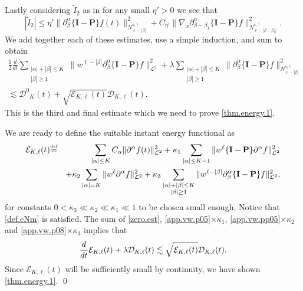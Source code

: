 \documentclass{amsart}
\numberwithin{equation}{section}
\begin{document}
Lastly considering $\tilde{I}_2$ as in \cite[(8.29)]{gsNonCut0} for any small $\eta'>0$ we see that
$$
\left| \tilde{I}_2 \right| 
\le
\eta'
\|\partial_{\beta}^{\alpha}\{{\mathbf{I}}-{\mathbf{P}}\}{f}(t)\|_{N^{s,\gamma}_{\ell - |\beta|}}^{2}
+
C_{\eta'}\|\nabla_{x}\partial_{\beta-\beta_{1}}^{\alpha}\{{\mathbf{I}}-{\mathbf{P}}\}{f} \|_{N^{s,\gamma}_{\ell - |\beta-\beta_1|}}^{2}.
$$
We add together each of these estimates, use a simple induction, and sum to obtain
\begin{multline}
\frac{1}{2}\frac{d}{dt}\sum_{\substack{|{\alpha}|+|{\beta}|\leq {K}\\ |{\beta}|\geq 1}}\|w^{{\ell}-|{\beta}|}{\partial}^{\alpha}_{\beta} \{{\mathbf{I}}-{\mathbf{P}}\} {f}\|_{{\mathcal{L}}^2}^2
+
{\lambda} 
\sum_{\substack{|{\alpha}|+|{\beta}|\leq {K}\\ |{\beta}|\geq 1}}\|{\partial}^{\alpha}_{\beta} \{{\mathbf{I}}-{\mathbf{P}}\} {f}\|^2_{N^{s,\gamma}_{\ell - |\beta|}}
\label{app.vw.p08}
\\
\lesssim  {{\mathcal{D}}^0}_{K}(t)+ \sqrt{{\mathcal{E}}_{{K},{\ell}}(t)}
{\mathcal{D}}_{{K},{\ell}}(t).
\end{multline}
This is the third and final estimate which we need to prove \eqref{thm.energy.1}.

We are ready to define the suitable instant energy functional as
\begin{eqnarray*}
{\mathcal{E}}_{{K},{\ell}}(t)&{\overset{\mbox{\tiny{def}}}{=}}& 
\sum_{|{\alpha}|\leq {K}}C_{\alpha} \|{\partial}^{\alpha} {f}(t)\|_{{\mathcal{L}}^2}^2
+
\kappa_1\sum_{|{\alpha}| \le {K}-1} \|w^{\ell}\{{\mathbf{I}}-{\mathbf{P}}\}{\partial}^{\alpha}{f}\|_{{\mathcal{L}}^2}^2
\\
&&
+
\kappa_2\sum_{|{\alpha}|= {K}} \|w^{\ell}{\partial}^{\alpha}{f}\|_{{\mathcal{L}}^2}^2
+
\kappa_3\sum_{\substack{|{\alpha}|+|{\beta}|\leq {K}\\ |{\beta}|\geq 1}}\|w^{{\ell}-|{\beta}|}{\partial}^{\alpha}_{\beta} \{{\mathbf{I}}-{\mathbf{P}}\} {f}\|_{{\mathcal{L}}^2}^2,
\end{eqnarray*}
for constants $0< \kappa_3\ll \kappa_2\ll \kappa_1\ll 1$ to be chosen small enough.  Notice that \eqref{def.eNm} is satisfied. The sum of  \eqref{zero.est}, \eqref{app.vw.p05}$\times \kappa_1$, \eqref{app.vw.pp05}$\times \kappa_2$ and \eqref{app.vw.p08}$\times \kappa_3$ implies that 
\begin{equation}  \notag
    \frac{d}{dt}{\mathcal{E}}_{{K},{\ell}}(t)+{\lambda} {\mathcal{D}}_{{K},{\ell}}(t)\lesssim \sqrt{{\mathcal{E}}_{{K},{\ell}}(t)}{\mathcal{D}}_{{K},{\ell}}(t).
\end{equation}
Since ${\mathcal{E}}_{{K},{\ell}}(t)$ will be sufficiently small by continuity, 
we have shown \eqref{thm.energy.1}.   \qed
\end{document}
